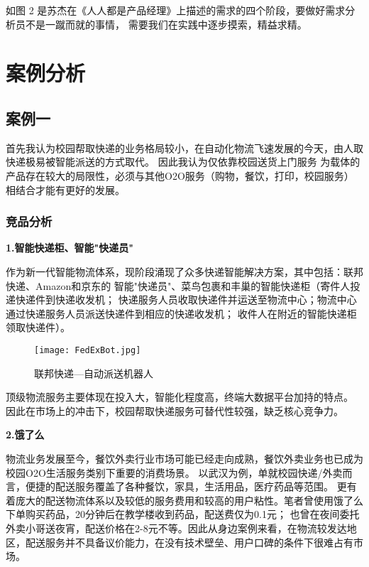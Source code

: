 \documentclass[withoutpreface,bwprint]{cumcmthesis} %
\begin{document}
如图 2 是苏杰在《人人都是产品经理》上描述的需求的四个阶段，要做好需求分析员不是一蹴而就的事情，
需要我们在实践中逐步摸索，精益求精。
\section{案例分析}

\subsection{案例一}

首先我认为校园帮取快递的业务格局较小，在自动化物流飞速发展的今天，由人取快递极易被智能派送的方式取代。
因此我认为仅依靠校园送货上门服务
为载体的产品存在较大的局限性，必须与其他O2O服务（购物，餐饮，打印，校园服务）相结合才能有更好的发展。
\subsubsection{竞品分析}

\textbf{1.智能快递柜、智能"快递员"}

作为新一代智能物流体系，现阶段涌现了众多快递智能解决方案，其中包括：联邦快递、Amazon和京东的
智能"快递员"、菜鸟包裹和丰巢的智能快递柜（寄件人投递快递件到快递收发机；
快递服务人员收取快递件并运送至物流中心；物流中心通过快递服务人员派送快递件到相应的快递收发机；
收件人在附近的智能快递柜领取快递件）。
\begin{figure}[!h]
    \centering
    \texttt{[image: FedExBot.jpg]}
    \caption{联邦快递—自动派送机器人}
    \label{fig:circuit-diagram}
\end{figure}

顶级物流服务主要体现在投入大，智能化程度高，终端大数据平台加持的特点。
因此在市场上的冲击下，校园帮取快递服务可替代性较强，缺乏核心竞争力。

\textbf{2.饿了么}

物流业务发展至今，餐饮外卖行业市场可能已经走向成熟，餐饮外卖业务也已成为校园O2O生活服务类别下重要的消费场景。
以武汉为例，单就校园快递/外卖而言，便捷的配送服务覆盖了各种餐饮，家具，生活用品，医疗药品等范围。
更有着庞大的配送物流体系以及较低的服务费用和较高的用户粘性。笔者曾使用饿了么下单购买药品，20分钟后在教学楼收到药品，配送费仅为0.1元；
也曾在夜间委托外卖小哥送夜宵，配送价格在2-8元不等。因此从身边案例来看，在物流较发达地区，配送服务并不具备议价能力，在没有技术壁垒、用户口碑的条件下很难占有市场。
\end{document}
